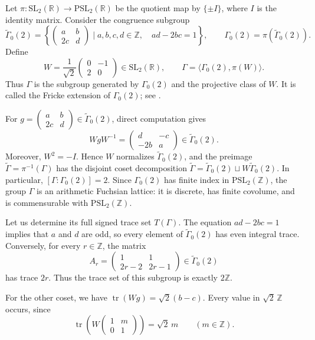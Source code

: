 \documentclass[reqno]{amsart}
\theoremstyle{remark}
\DeclareMathOperator{\tr}{tr}
\begin{document}
Let $\pi:\mathrm{SL}_2(\mathbb R)\to\mathrm{PSL}_2(\mathbb R)$ be the quotient map by $\{\pm I\}$, where $I$ is the identity matrix. Consider the congruence subgroup
$$
\widetilde{\Gamma}_0(2)
=
\left\{
\begin{pmatrix}a&b\\2c&d\end{pmatrix}
\mid a,b,c,d\in\mathbb Z,\quad ad-2bc=1
\right\},
\qquad
\Gamma_0(2)=\pi(\widetilde{\Gamma}_0(2)).
$$
Define
$$
W=\frac1{\sqrt2}
\begin{pmatrix}0&-1\\2&0\end{pmatrix} \in\mathrm{SL}_2(\mathbb R),
\qquad \Gamma=\langle\Gamma_0(2),\pi(W)\rangle.
$$
Thus $\Gamma$ is the subgroup generated by $\Gamma_0(2)$ and the projective class of $W$. It is called the Fricke extension of $\Gamma_0(2)$; see \cite[\S1]{CMS}.

For $g=\begin{pmatrix}a&b\\2c&d\end{pmatrix}\in\widetilde{\Gamma}_0(2)$, direct computation gives
$$
WgW^{-1} =
\begin{pmatrix}
d&-c\\
-2b&a
\end{pmatrix} \in\widetilde{\Gamma}_0(2).
$$
Moreover, $W^2=-I$. Hence $W$ normalizes $\widetilde{\Gamma}_0(2)$, and the preimage $\widetilde{\Gamma}=\pi^{-1}(\Gamma)$ has the disjoint coset decomposition $\widetilde{\Gamma} = \widetilde{\Gamma}_0(2) \sqcup W\widetilde{\Gamma}_0(2)$. In particular, $[\Gamma:\Gamma_0(2)]=2$. Since $\Gamma_0(2)$ has finite index in $\mathrm{PSL}_2(\mathbb Z)$, the group $\Gamma$ is an arithmetic Fuchsian lattice: it is discrete, has finite covolume, and is commensurable with $\mathrm{PSL}_2(\mathbb Z)$.

Let us determine its full signed trace set $T(\Gamma)$. The equation $ad-2bc=1$ implies that $a$ and $d$ are odd, so every element of $\widetilde{\Gamma}_0(2)$ has even integral trace. Conversely, for every $r\in\mathbb Z$, the matrix
$$
A_r=
\begin{pmatrix}1&1\\2r-2&2r-1\end{pmatrix}
\in\widetilde{\Gamma}_0(2)
$$
has trace $2r$. Thus the trace set of this subgroup is exactly $2\mathbb Z$.

For the other coset, we have $\tr (Wg)=\sqrt2(b-c)$.
Every value in $\sqrt2\,\mathbb Z$ occurs, since
$$
\operatorname{tr}\left(
W\begin{pmatrix}1&m\\0&1\end{pmatrix}
\right)=\sqrt2\,m
\qquad(m\in\mathbb Z).
$$
\end{document}

